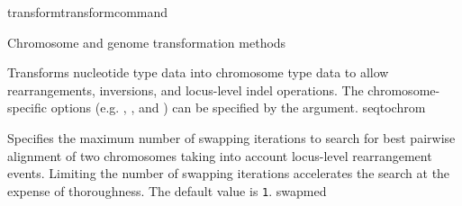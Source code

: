 \begin{command}{transform}{transformcommand}
\begin{arguments}
\begin{argumentgroup}{Chromosome and genome transformation methods}
\begin{description}




%             
{Transforms nucleotide type data into chromosome type data to allow
rearrangements, inversions, and locus-level indel operations. The
chromosome-specific options (e.g. , 
, %
and ) can be specified by the argument.}
{seqtochrom}

{Specifies the maximum number of swapping iterations
to search for best pairwise alignment of two chromosomes
taking into account locus-level rearrangement events. 
Limiting the number of swapping
iterations accelerates the search at the expense of
thoroughness. The default value is \texttt{1}.}
{swapmed}


\end{description}
\end{argumentgroup}
\end{arguments}
\end{command}
